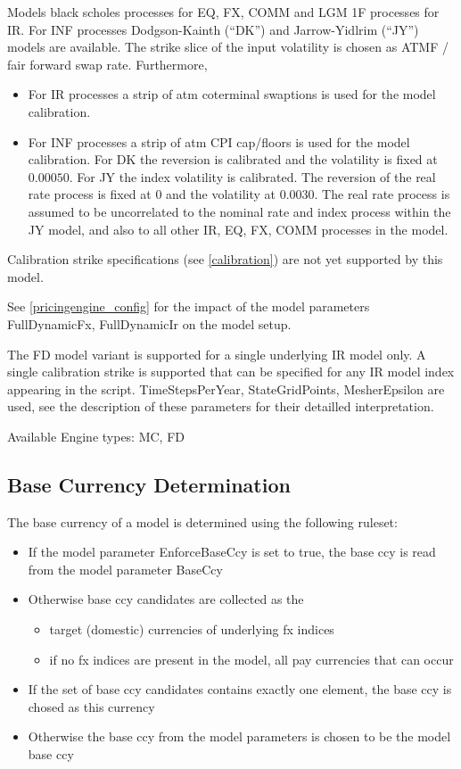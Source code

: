 Models black scholes processes for EQ, FX, COMM and LGM 1F processes for IR. For INF processes Dodgson-Kainth (``DK'')
and Jarrow-Yidlrim (``JY'') models are available. The strike slice of the input volatility is chosen as ATMF / fair
forward swap rate. Furthermore,

\begin{itemize}
\item For IR processes a strip of atm coterminal swaptions is used for the model calibration.
\item For INF processes a strip of atm CPI cap/floors is used for the model calibration. For DK the reversion is
  calibrated and the volatility is fixed at $0.00050$. For JY the index volatility is calibrated. The reversion of the
  real rate process is fixed at $0$ and the volatility at $0.0030$. The real rate process is assumed to be uncorrelated
  to the nominal rate and index process within the JY model, and also to all other IR, EQ, FX, COMM processes in the
  model.
\end{itemize}

Calibration strike specifications (see \ref{calibration}) are not yet supported by this model.

See \ref{pricingengine_config} for the impact of the model parameters FullDynamicFx, FullDynamicIr on the model setup.

The FD model variant is supported for a single underlying IR model only. A single calibration strike is supported that
can be specified for any IR model index appearing in the script. TimeStepsPerYear, StateGridPoints, MesherEpsilon are
used, see the description of these parameters for their detailled interpretation.

\smallskip
Available Engine types: MC, FD

\subsection{Base Currency Determination}\label{baseccy_determination}

The base currency of a model is determined using the following ruleset:

\begin{itemize}
\item If the model parameter EnforceBaseCcy is set to true, the base ccy is read from the model parameter BaseCcy
\item Otherwise base ccy candidates are collected as the
  \begin{itemize}
    \item target (domestic) currencies of underlying fx indices
    \item if no fx indices are present in the model, all pay currencies that can occur
  \end{itemize}
\item If the set of base ccy candidates contains exactly one element, the base ccy is chosed as this currency
\item Otherwise the base ccy from the model parameters is chosen to be the model base ccy
\end{itemize}


